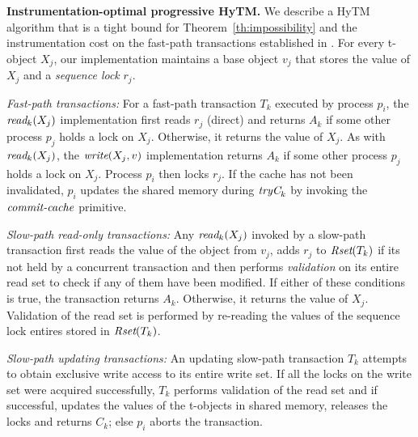 \vspace{1mm}\noindent\textbf{Instrumentation-optimal progressive HyTM.}
We describe a HyTM algorithm that is a tight bound for Theorem~\ref{th:impossibility} and the instrumentation cost on the fast-path transactions established in \cite{hytm14disc}.
For every t-object $X_j$, our implementation maintains a base object $v_j$ that stores the value of $X_j$
and a \emph{sequence lock} $r_{j}$. 

\vspace{1mm}\noindent\textit{Fast-path transactions:}
For a fast-path transaction $T_k$ executed by process $p_i$, the $\textit{read}_k(X_j)$ implementation first reads $r_j$ (direct)
and returns $A_k$ if some other process $p_j$ holds a lock on $X_j$.
Otherwise, it returns the value of $X_j$.
As with $\textit{read}_k(X_j)$, the $\textit{write} (X_j,v)$ implementation returns $A_k$ if some other process $p_j$ holds a lock on $X_j$.
Process $p_i$ then locks $r_j$. If the cache has not been invalidated, $p_i$ updates the shared memory
during $\textit{tryC}_k$ by invoking the $\ms{commit-cache}$ primitive.

\vspace{1mm}\noindent\textit{Slow-path read-only transactions:}
Any $\textit{read}_k(X_j)$ invoked by a slow-path transaction first reads the value of the object from $v_j$, 
adds $r_j$ to $\textit{Rset}(T_k)$ if its not held by a concurrent transaction
and then performs \emph{validation} on its entire read set to check if any of them have been modified. 
If either of these conditions is true,
the transaction returns $A_k$. Otherwise, it returns the value of $X_j$. 
Validation of the read set is performed by re-reading the values of the sequence lock entires stored in $\textit{Rset}(T_k)$.

\vspace{1mm}\noindent\textit{Slow-path updating transactions:}
An updating slow-path transaction $T_k$ attempts to obtain exclusive write access to its 
entire write set.
If all the locks on the write set were acquired successfully, $T_k$ performs validation of the read set and if successful, updates the values of
the t-objects in shared memory, releases the locks and returns $C_k$; else $p_i$ aborts the transaction.

